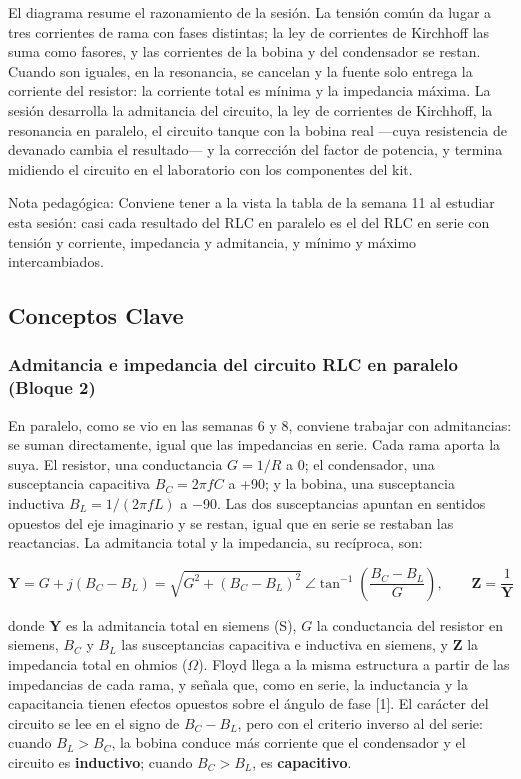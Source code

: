 \documentclass[11pt,letterpaper]{article}
\begin{document}
El diagrama resume el razonamiento de la sesión. La tensión común da lugar a tres corrientes de rama con fases distintas; la ley de corrientes de Kirchhoff las suma como fasores, y las corrientes de la bobina y del condensador se restan. Cuando son iguales, en la resonancia, se cancelan y la fuente solo entrega la corriente del resistor: la corriente total es mínima y la impedancia máxima. La sesión desarrolla la admitancia del circuito, la ley de corrientes de Kirchhoff, la resonancia en paralelo, el circuito tanque con la bobina real ---cuya resistencia de devanado cambia el resultado--- y la corrección del factor de potencia, y termina midiendo el circuito en el laboratorio con los componentes del kit.

\begin{nota}{Nota pedagógica:}
Conviene tener a la vista la tabla de la semana 11 al estudiar esta sesión: casi cada resultado del RLC en paralelo es el del RLC en serie con tensión y corriente, impedancia y admitancia, y mínimo y máximo intercambiados.
\end{nota}

\subsection{Conceptos Clave}

\subsubsection{Admitancia e impedancia del circuito RLC en paralelo (Bloque 2)}

En paralelo, como se vio en las semanas 6 y 8, conviene trabajar con admitancias: se suman directamente, igual que las impedancias en serie. Cada rama aporta la suya. El resistor, una conductancia $G = 1/R$ a 0\textdegree{}; el condensador, una susceptancia capacitiva $B_C = 2\pi f C$ a +90\textdegree{}; y la bobina, una susceptancia inductiva $B_L = 1/(2\pi f L)$ a \ensuremath{-}90\textdegree{}. Las dos susceptancias apuntan en sentidos opuestos del eje imaginario y se restan, igual que en serie se restaban las reactancias. La admitancia total y la impedancia, su recíproca, son:

\begin{equation}
  \mathbf{Y} = G + j(B_C - B_L) = \sqrt{G^{2} + (B_C - B_L)^{2}}\ \angle \tan^{-1}\!\left(\frac{B_C - B_L}{G}\right), \qquad \mathbf{Z} = \frac{1}{\mathbf{Y}}
\end{equation}

donde $\mathbf{Y}$ es la admitancia total en siemens (S), $G$ la conductancia del resistor en siemens, $B_C$ y $B_L$ las susceptancias capacitiva e inductiva en siemens, y $\mathbf{Z}$ la impedancia total en ohmios (\ensuremath{\Omega}). Floyd llega a la misma estructura a partir de las impedancias de cada rama, y señala que, como en serie, la inductancia y la capacitancia tienen efectos opuestos sobre el ángulo de fase [1]. El carácter del circuito se lee en el signo de $B_C - B_L$, pero con el criterio inverso al del serie: cuando $B_L > B_C$, la bobina conduce más corriente que el condensador y el circuito es \textbf{inductivo}; cuando $B_C > B_L$, es \textbf{capacitivo}.
\end{document}
